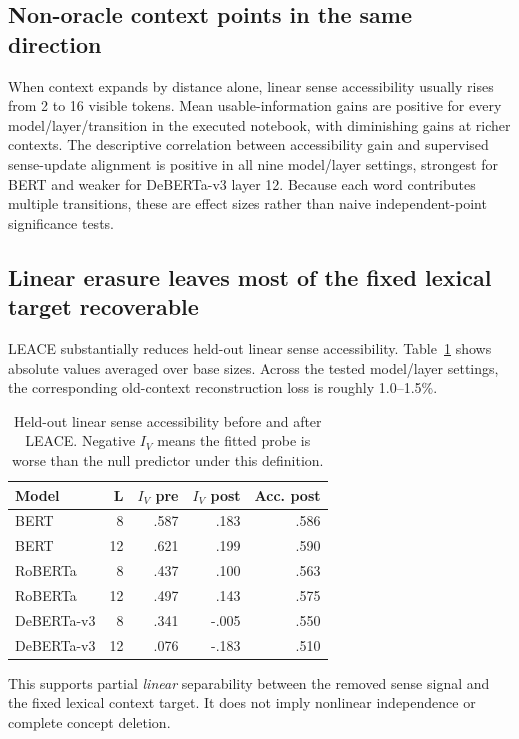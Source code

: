\documentclass[10pt,twocolumn]{article}
\begin{document}
\subsection{Non-oracle context points in the same direction}
When context expands by distance alone, linear sense accessibility usually rises from 2 to 16 visible tokens. Mean usable-information gains are positive for every model/layer/transition in the executed notebook, with diminishing gains at richer contexts. The descriptive correlation between accessibility gain and supervised sense-update alignment is positive in all nine model/layer settings, strongest for BERT and weaker for DeBERTa-v3 layer 12. Because each word contributes multiple transitions, these are effect sizes rather than naive independent-point significance tests.

\subsection{Linear erasure leaves most of the fixed lexical target recoverable}
LEACE substantially reduces held-out linear sense accessibility. Table~\ref{tab:leace} shows absolute values averaged over base sizes. Across the tested model/layer settings, the corresponding old-context reconstruction loss is roughly 1.0--1.5\%.

\begin{table}[t]
\centering
\small
\begin{tabular}{lrrrr}
\toprule
Model & L & $I_V$ pre & $I_V$ post & Acc. post\\
\midrule
BERT & 8 & .587 & .183 & .586\\
BERT & 12 & .621 & .199 & .590\\
RoBERTa & 8 & .437 & .100 & .563\\
RoBERTa & 12 & .497 & .143 & .575\\
DeBERTa-v3 & 8 & .341 & -.005 & .550\\
DeBERTa-v3 & 12 & .076 & -.183 & .510\\
\bottomrule
\end{tabular}
\caption{Held-out linear sense accessibility before and after LEACE. Negative $I_V$ means the fitted probe is worse than the null predictor under this definition.}
\label{tab:leace}
\end{table}

This supports partial \emph{linear} separability between the removed sense signal and the fixed lexical context target. It does not imply nonlinear independence or complete concept deletion.
\end{document}
